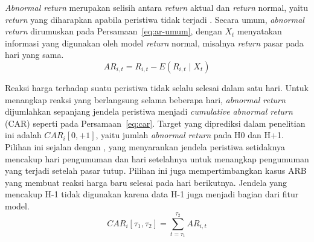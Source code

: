 \emph{Abnormal return} merupakan selisih antara \emph{return} aktual dan \emph{return} normal, yaitu \emph{return} yang diharapkan apabila peristiwa tidak terjadi \autocite{mackinlay1997}. Secara umum, \emph{abnormal return} dirumuskan pada Persamaan~\ref{eq:ar-umum}, dengan $X_t$ menyatakan informasi yang digunakan oleh model \emph{return} normal, misalnya \emph{return} pasar pada hari yang sama.
\begin{equation}
AR_{i,t} = R_{i,t} - E\left(R_{i,t} \mid X_t\right)
\label{eq:ar-umum}
\end{equation}

Reaksi harga terhadap suatu peristiwa tidak selalu selesai dalam satu hari. Untuk menangkap reaksi yang berlangsung selama beberapa hari, \emph{abnormal return} dijumlahkan sepanjang jendela peristiwa menjadi \emph{cumulative abnormal return} (CAR) seperti pada Persamaan~\ref{eq:car}. Target yang diprediksi dalam penelitian ini adalah $CAR_i[0,+1]$, yaitu jumlah \emph{abnormal return} pada H0 dan H+1. Pilihan ini sejalan dengan \textcite{mackinlay1997}, yang menyarankan jendela peristiwa setidaknya mencakup hari pengumuman dan hari setelahnya untuk menangkap pengumuman yang terjadi setelah pasar tutup. Pilihan ini juga mempertimbangkan kasus ARB yang membuat reaksi harga baru selesai pada hari berikutnya. Jendela yang mencakup H-1 tidak digunakan karena data H-1 juga menjadi bagian dari fitur model.
\begin{equation}
CAR_i[\tau_1, \tau_2] = \sum_{t=\tau_1}^{\tau_2} AR_{i,t}
\label{eq:car}
\end{equation}

